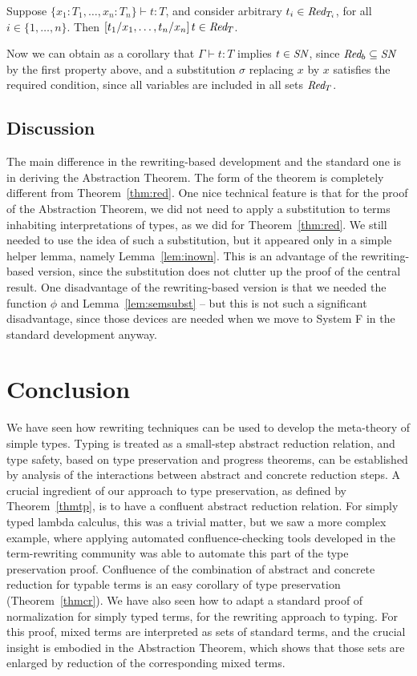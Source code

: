 \documentclass{LMCS}
\begin{document}
\begin{thm}[Reducibility]
\label{thm:red}
Suppose $\{ x_1 : T_1, \ldots, x_n : T_n \} \vdash t : T$, and
consider arbitrary $t_i\in\textit{Red}_{T_i}$, for all $i\in\{1,\ldots,n\}$.
Then $[t_1/x_1, \ldots, t_n/x_n]\, t\in\textit{Red}_{T}$.
\end{thm}

\noindent Now we can obtain as a corollary that $\Gamma \vdash t : T$
implies $t\in\textit{SN}$, since $\textit{Red}_{b}\subseteq \textit{SN}$ by the first property
above, and a substitution $\sigma$ replacing $x$ by $x$ satisfies the
required condition, since all variables are included in all sets
$\textit{Red}_{T}$.

\subsection{Discussion}

The main difference in the rewriting-based development and the
standard one is in deriving the Abstraction Theorem.  The form of the
theorem is completely different from Theorem~\ref{thm:red}.  One nice
technical feature is that for the proof of the Abstraction Theorem, we
did not need to apply a substitution to terms inhabiting
interpretations of types, as we did for Theorem~\ref{thm:red}.  We
still needed to use the idea of such a substitution, but it appeared
only in a simple helper lemma, namely Lemma~\ref{lem:inown}.  This is
an advantage of the rewriting-based version, since the substitution
does not clutter up the proof of the central result.  One disadvantage
of the rewriting-based version is that we needed the function $\phi$
and Lemma~\ref{lem:semsubst} -- but this is not such a significant
disadvantage, since those devices are needed when we move to System F
in the standard development anyway.

\section{Conclusion}
\label{sec:conclusion}

We have seen how rewriting techniques can be used to develop the
meta-theory of simple types.  Typing is treated as a small-step
abstract reduction relation, and type safety, based on type
preservation and progress theorems, can be established by analysis of
the interactions between abstract and concrete reduction steps.  A
crucial ingredient of our approach to type preservation, as defined by
Theorem~\ref{thmtp}, is to have a confluent abstract reduction
relation.  For simply typed lambda calculus, this was a trivial
matter, but we saw a more complex example, where applying automated
confluence-checking tools developed in the term-rewriting community
was able to automate this part of the type preservation proof.
Confluence of the combination of abstract and concrete reduction for
typable terms is an easy corollary of type preservation
(Theorem~\ref{thmcr}).  We have also seen how to adapt a standard
proof of normalization for simply typed terms, for the rewriting
approach to typing.  For this proof, mixed terms are interpreted as
sets of standard terms, and the crucial insight is embodied in the
Abstraction Theorem, which shows that those sets are enlarged by
reduction of the corresponding mixed terms.
\end{document}
